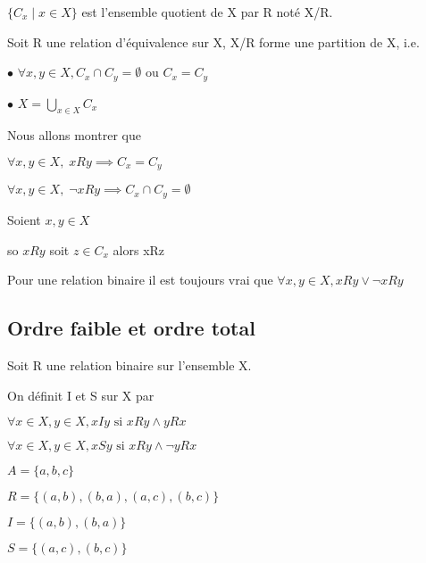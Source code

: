 \documentclass[a4paper, 12pt]{article}
\begin{document}
$\{C_x \mid x \in X\}$ est l'ensemble quotient de X par R noté X/R.

\begin{proposition}
    Soit R une relation d'équivalence sur X, X/R forme une partition de X,
    i.e.

    \item $\bullet$ $\forall x, y \in X, C_x \cap C_y = \emptyset \text{ ou } C_x = C_y$
    \item $\bullet$ $X = \bigcup_{x \in X} C_x$
\end{proposition}

\begin{demonstration}
    Nous allons montrer que

    $\forall x, y \in X, \; xRy \implies C_x = C_y$

    $\forall x, y \in X, \; \neg xRy \implies C_x \cap C_y = \emptyset$

    Soient $x, y \in X$

    so $xRy$ soit $z \in C_x$ alors xRz
\end{demonstration}

\begin{remark}
    Pour une relation binaire il est toujours vrai que $\forall x, y \in X, xRy \lor \neg xRy$
\end{remark}





\subsection{Ordre faible et ordre total}

Soit R une relation binaire sur l'ensemble X.

\vspace{1em}

\noindent
On définit I et S sur X par

$\forall x \in X, y \in X, xIy \text{ si } xRy \land yRx$

$\forall x \in X, y \in X, xSy \text{ si } xRy \land \neg yRx$

\begin{example}
    $A = \{a, b, c\}$

    $R = \{(a, b), (b, a), (a, c), (b, c)\}$

    $I = \{(a, b), (b, a)\}$

    $S = \{(a, c), (b, c)\}$
\end{example}
\end{document}
